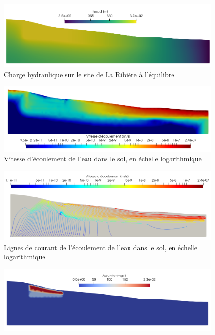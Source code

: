\documentclass{article}
\begin{document}
\begin{figure}[H]
    \centering
    \includegraphics[width=\linewidth]{LJ-charge-hydraulique-finale.PNG}
    \caption{Charge hydraulique sur le site de La Ribière à l'équilibre}
    \label{fig:charge_hydro_finale}
\end{figure}

\begin{figure}[H]
    \centering
    \includegraphics[width=\linewidth]{LJ-vitesse-ecoulement.PNG}
    \caption{Vitesse d'écoulement de l'eau dans le sol, en échelle logarithmique}
    \label{fig:vitesse_ecoulement}
\end{figure}
\begin{figure}[H]
    \centering
    \includegraphics[width=\linewidth]{LJ-flowrate-lines.PNG}
    \caption{Lignes de courant de l'écoulement de l'eau dans le sol, en échelle logarithmique}
    \label{fig:vitesse_ecoulement_lines}
\end{figure}

\begin{figure}[H]
    \centering
    \includegraphics[width=\linewidth]{LJ-Autunite-concentration.PNG}
    \caption{}
    \label{fig:concentration_autunite}
\end{figure}
\end{document}
